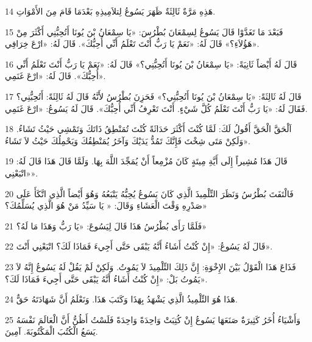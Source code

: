 \par 14 هَذِهِ مَرَّةٌ ثَالِثَةٌ ظَهَرَ يَسُوعُ لِتلاَمِيذِهِ بَعْدَمَا قَامَ مِنَ الأَمْوَاتِ.
\par 15 فَبَعْدَ مَا تَغَدَّوْا قَالَ يَسُوعُ لِسِمْعَانَ بُطْرُسَ: «يَا سِمْعَانُ بْنَ يُونَا أَتُحِبُّنِي أَكْثَرَ مِنْ هَؤُلاَءِ؟» قَالَ لَهُ: «نَعَمْ يَا رَبُّ أَنْتَ تَعْلَمُ أَنِّي أُحِبُّكَ». قَالَ لَهُ: «ارْعَ خِرَافِي».
\par 16 قَالَ لَهُ أَيْضاً ثَانِيَةً: «يَا سِمْعَانُ بْنَ يُونَا أَتُحِبُّنِي؟» قَالَ لَهُ: «نَعَمْ يَا رَبُّ أَنْتَ تَعْلَمُ أَنِّي أُحِبُّكَ». قَالَ لَهُ: «ارْعَ غَنَمِي».
\par 17 قَالَ لَهُ ثَالِثَةً: «يَا سِمْعَانُ بْنَ يُونَا أَتُحِبُّنِي؟» فَحَزِنَ بُطْرُسُ لأَنَّهُ قَالَ لَهُ ثَالِثَةً: أَتُحِبُّنِي؟ فَقَالَ لَهُ: «يَا رَبُّ أَنْتَ تَعْلَمُ كُلَّ شَيْءٍ. أَنْتَ تَعْرِفُ أَنِّي أُحِبُّكَ». قَالَ لَهُ يَسُوعُ: «ارْعَ غَنَمِي.
\par 18 اَلْحَقَّ الْحَقَّ أَقُولُ لَكَ: لَمَّا كُنْتَ أَكْثَرَ حَدَاثَةً كُنْتَ تُمَنْطِقُ ذَاتَكَ وَتَمْشِي حَيْثُ تَشَاءُ. وَلَكِنْ مَتَى شِخْتَ فَإِنَّكَ تَمُدُّ يَدَيْكَ وَآخَرُ يُمَنْطِقُكَ وَيَحْمِلُكَ حَيْثُ لاَ تَشَاءُ».
\par 19 قَالَ هَذَا مُشِيراً إِلَى أَيَّةِ مِيتَةٍ كَانَ مُزْمِعاً أَنْ يُمَجِّدَ اللَّهَ بِهَا. وَلَمَّا قَالَ هَذَا قَالَ لَهُ: «اتْبَعْنِي».
\par 20 فَالْتَفَتَ بُطْرُسُ وَنَظَرَ التِّلْمِيذَ الَّذِي كَانَ يَسُوعُ يُحِبُّهُ يَتْبَعُهُ وَهُوَ أَيْضاً الَّذِي اتَّكَأَ عَلَى صَدْرِهِ وَقْتَ الْعَشَاءِ وَقَالَ: « يَا سَيِّدُ مَنْ هُوَ الَّذِي يُسَلِّمُكَ؟»
\par 21 فَلَمَّا رَأَى بُطْرُسُ هَذَا قَالَ لِيَسُوعَ: «يَا رَبُّ وَهَذَا مَا لَهُ؟»
\par 22 قَالَ لَهُ يَسُوعُ: «إِنْ كُنْتُ أَشَاءُ أَنَّهُ يَبْقَى حَتَّى أَجِيءَ فَمَاذَا لَكَ؟ اتْبَعْنِي أَنْتَ».
\par 23 فَذَاعَ هَذَا الْقَوْلُ بَيْنَ الإِخْوَةِ: إِنَّ ذَلِكَ التِّلْمِيذَ لاَ يَمُوتُ. وَلَكِنْ لَمْ يَقُلْ لَهُ يَسُوعُ إِنَّهُ لاَ يَمُوتُ بَلْ: «إِنْ كُنْتُ أَشَاءُ أَنَّهُ يَبْقَى حَتَّى أَجِيءَ فَمَاذَا لَكَ؟».
\par 24 هَذَا هُوَ التِّلْمِيذُ الَّذِي يَشْهَدُ بِهَذَا وَكَتَبَ هَذَا. وَنَعْلَمُ أَنَّ شَهَادَتَهُ حَقٌّ.
\par 25 وَأَشْيَاءُ أُخَرُ كَثِيرَةٌ صَنَعَهَا يَسُوعُ إِنْ كُتِبَتْ وَاحِدَةً وَاحِدَةً فَلَسْتُ أَظُنُّ أَنَّ الْعَالَمَ نَفْسَهُ يَسَعُ الْكُتُبَ الْمَكْتُوبَةَ. آمِينَ.

